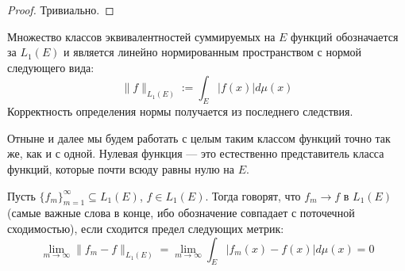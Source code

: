 \begin{proof}
	Тривиально.
\end{proof}

\begin{corollary}
	Множество классов эквивалентностей суммируемых на $E$ функций обозначается за $L_1(E)$ и является линейно нормированным пространством с нормой следующего вида:
	\[
		\|f\|_{L_1(E)} := \int_E |f(x)|d\mu(x)
	\]
	Корректность определения нормы получается из последнего следствия.
\end{corollary}

\begin{note}
	Отныне и далее мы будем работать с целым таким классом функций точно так же, как и с одной. Нулевая функция --- это естественно представитель класса функций, которые почти всюду равны нулю на $E$.
\end{note}

\begin{definition}
	Пусть $\{f_m\}_{m = 1}^\infty \subseteq L_1(E)$, $f \in L_1(E)$. Тогда говорят, что $f_m \to f$ в $L_1(E)$ (самые важные слова в конце, ибо обозначение совпадает с поточечной сходимостью), если сходится предел следующих метрик:
	\[
		\lim_{m \to \infty} \|f_m - f\|_{L_1(E)} = \lim_{m \to \infty} \int_{E} |f_m(x) - f(x)|d\mu(x) = 0
	\]
\end{definition}